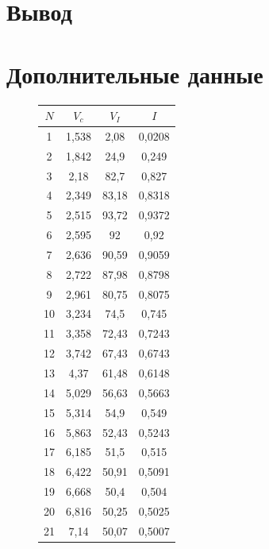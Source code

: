 \documentclass[12pt]{article}
\begin{document}
    \section{Вывод}

    \newpage
    \section{Дополнительные данные}

      \begin{figure}[h!]
        \begin{minipage}[h]{0.49\linewidth}

          \begin{tabular}{ | c | c | c | c | }
            \hline
            $N$ & $V_c$ & $V_I$ & $I$ \\ \hline
            1 & 1,538 & 2,08 & 0,0208 \\
            2 & 1,842 & 24,9 & 0,249 \\
            3 & 2,18 & 82,7 & 0,827 \\
            4 & 2,349 & 83,18 & 0,8318 \\
            5 & 2,515 & 93,72 & 0,9372 \\
            6 & 2,595 & 92 & 0,92 \\
            7 & 2,636 & 90,59 & 0,9059 \\
            8 & 2,722 & 87,98 & 0,8798 \\
            9 & 2,961 & 80,75 & 0,8075 \\
            10 & 3,234 & 74,5 & 0,745 \\
            11 & 3,358 & 72,43 & 0,7243 \\
            12 & 3,742 & 67,43 & 0,6743 \\
            13 & 4,37 & 61,48 & 0,6148 \\
            14 & 5,029 & 56,63 & 0,5663 \\
            15 & 5,314 & 54,9 & 0,549 \\
            16 & 5,863 & 52,43 & 0,5243 \\
            17 & 6,185 & 51,5 & 0,515 \\
            18 & 6,422 & 50,91 & 0,5091 \\
            19 & 6,668 & 50,4 & 0,504 \\
            20 & 6,816 & 50,25 & 0,5025 \\
            21 & 7,14 & 50,07 & 0,5007 \\

\end{tabular}
\end{minipage}
\end{figure}
\end{document}

